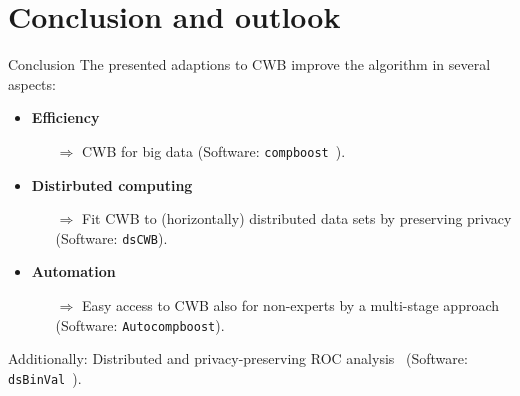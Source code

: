 \documentclass[t,10pt]{beamer}
\begin{document}

\section{Conclusion and outlook}

\begin{frame}{Conclusion}
      The presented adaptions to CWB improve the algorithm in several aspects:
      \begin{itemize}
        \item
          \textbf{Efficiency}~\citep{schalk2022accelerated}
        \begin{itemize}
          \item[$\Rightarrow$]
            CWB for big data (Software: \texttt{compboost}~\citep{schalk2018compboost}).
        \end{itemize}
        \item
          \textbf{Distirbuted computing}~\citep{schalk2022distcwb}
            \begin{itemize}
              \item[$\Rightarrow$]
                Fit CWB to (horizontally) distributed data sets by preserving privacy (Software: \texttt{dsCWB}).
            \end{itemize}
        \item \textbf{Automation}~\citep{coors2021autocompboost}
          \begin{itemize}\item[$\Rightarrow$]
            Easy access to CWB also for non-experts by a multi-stage approach (Software: \texttt{Autocompboost}).
          \end{itemize}
      \end{itemize}
      Additionally: Distributed and privacy-preserving ROC analysis~\citep{schalk2022dauc} (Software: \texttt{dsBinVal}~\citep{schalk2022dsBinVal}).
\end{frame}
\end{document}
